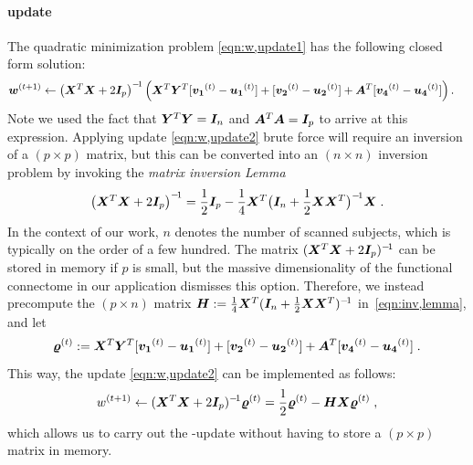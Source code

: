 \paragraph{\w update}
The quadratic minimization problem \eqref{eqn:w,update1} has the following closed form solution:
\begin{align}
	{\ensuremath{\bm{w}}}^{(t+1)} \leftarrow \left({\bm{X}}^T{\bm{X}} + 2\bm{I}_p\right)^{-\!1}  
		\Big(&{\bm{X}}^T{\bm{Y}}^T [{\bm{v_1}}^{(t)}-{\bm{u_1}}^{(t)}] 
		+[{\bm{v_2}}^{(t)}-{\bm{u_2}}^{(t)}]  
		 +{\bm{A}}^T[{\bm{v_4}}^{(t)}-{\bm{u_4}}^{(t)}] \Big) \,. \label{eqn:w,update2}
\end{align}
Note we used the fact that ${\bm{Y}}^T{\bm{Y}}={\bm{I}}_n$ and ${\bm{A}}^T{\bm{A}}={\bm{I}}_p$ to arrive at this expression.
Applying update \eqref{eqn:w,update2} brute force will require an inversion of a $(p\times p)$ matrix, but this can be converted into an $(n\times n)$ inversion problem by invoking the \emph{matrix inversion Lemma}
\begin{equation}
	\left( {\bm{X}}^T{\bm{X}} + 2\bm{I}_p   \right)^{-\!1} = 
	\frac{1}{2}{\bm{I}}_p - \frac{1}{4}{\bm{X}}^T \big( {\bm{I}}_n + \frac{1}{2}{\bm{X}}{\bm{X}}^T \big)^{-\!1}{\bm{X}} \; .
	\label{eqn:inv,lemma}
\end{equation}
In the context of our work, $n$ denotes the number of scanned subjects, which is typically on the order of a few hundred.
The matrix $({\bm{X}}^T{\bm{X}} + 2\bm{I}_p)^{-\!1}$ can be stored in memory if $p$ is small, but the massive dimensionality of the functional connectome in our application dismisses this option.
Therefore, we instead precompute the $(p\times n)$ matrix $\bm{H}:=\frac{1}{4}{\bm{X}}^T({\bm{I}}_n+\frac{1}{2}{\bm{X}}{\bm{X}}^T)^{-\!1}$ in~\eqref{eqn:inv,lemma}, and let
\[\bm{\varrho}^{(t)}:={\bm{X}}^T{\bm{Y}}^T [{\bm{v_1}}^{(t)}-{\bm{u_1}}^{(t)}] +[{\bm{v_2}}^{(t)}-{\bm{u_2}}^{(t)}] +{\bm{A}}^T[{\bm{v_4}}^{(t)}-{\bm{u_4}}^{(t)}]\;.\]
This way, the update \eqref{eqn:w,update2} can be implemented as follows:
\begin{equation}
	w^{(t+1)} \leftarrow({\bm{X}}^T{\bm{X}} + 2{\bm{I}}_p)^{-\!1}\bm{\varrho}^{(t)}=\frac{1}{2}\bm{\varrho}^{(t)} - \bm{H}{\bm{X}}\bm{\varrho}^{(t)}\;,
	\label{eqn:inv,lemma2}
\end{equation}
which allows us to carry out the \w-update without having to store a $(p\times p)$ matrix in memory.

